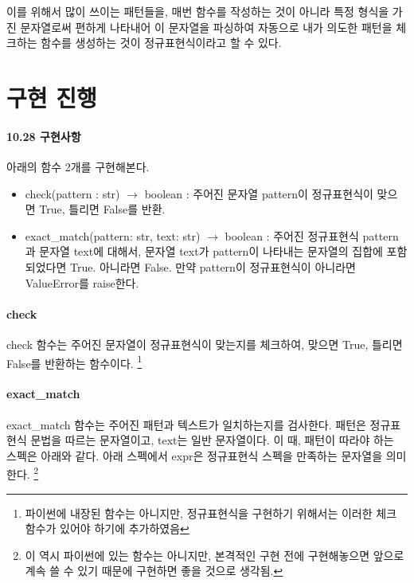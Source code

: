 \documentclass[twoside]{article}
\begin{document}
이를 위해서 많이 쓰이는 패턴들을, 매번 함수를 작성하는 것이 아니라 특정 형식을 가진 문자열로써 편하게 나타내어 이 문자열을 파싱하여 자동으로 내가 의도한 패턴을 체크하는 함수를 생성하는 것이 정규표현식이라고 할 수 있다. 

\newpage

\section{구현 진행}

\paragraph{10.28 구현사항} 아래의 함수 2개를 구현해본다. 

\begin{itemize} 
\item check(pattern : str) $\rightarrow$ boolean : 주어진 문자열 pattern이 정규표현식이 맞으면 True, 틀리면 False를 반환. 
\item exact\_match(pattern: str, text: str) $\rightarrow$ boolean : 주어진 정규표현식 pattern과 문자열 text에 대해서, 문자열 text가 pattern이 나타내는 문자열의 집합에 포함되었다면 True. 아니라면 False. 만약 pattern이 정규표현식이 아니라면 ValueError를 raise한다. 
\end{itemize}


\paragraph{check} check 함수는 주어진 문자열이 정규표현식이 맞는지를 체크하여, 맞으면 True, 틀리면 False를 반환하는 함수이다. \footnote{파이썬에 내장된 함수는 아니지만, 정규표현식을 구현하기 위해서는 이러한 체크 함수가 있어야 하기에 추가하였음} 

\paragraph{exact\_match} exact\_match 함수는 주어진 패턴과 텍스트가 일치하는지를 검사한다. 패턴은 정규표현식 문법을 따르는 문자열이고, text는 일반 문자열이다. 이 때, 패턴이 따라야 하는 스펙은 아래와 같다. 아래 스펙에서 expr은 정규표현식 스펙을 만족하는 문자열을 의미한다. \footnote{이 역시 파이썬에 있는 함수는 아니지만, 본격적인 구현 전에 구현해놓으면 앞으로 계속 쓸 수 있기 때문에 구현하면 좋을 것으로 생각됨.} 

\end{document}
